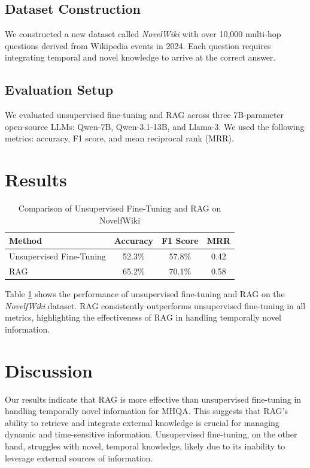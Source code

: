 \documentclass[11pt]{article}
\begin{document}
\subsection{Dataset Construction}
We constructed a new dataset called \textit{NovelWiki} with over 10,000 multi-hop questions derived from Wikipedia events in 2024. Each question requires integrating temporal and novel knowledge to arrive at the correct answer.

\subsection{Evaluation Setup}
We evaluated unsupervised fine-tuning and RAG across three 7B-parameter open-source LLMs: Qwen-7B, Qwen-3.1-13B, and Llama-3. We used the following metrics: accuracy, F1 score, and mean reciprocal rank (MRR).

\section{Results}
\begin{table}[ht]
  \centering
  \caption{Comparison of Unsupervised Fine-Tuning and RAG on NovelfWiki}
  \label{tab:results}
  \begin{tabular}{l|ccc}
    \toprule
    Method & Accuracy & F1 Score & MRR \\
    \midrule
    Unsupervised Fine-Tuning & 52.3\% & 57.8\% & 0.42 \\
    RAG & 65.2\% & 70.1\% & 0.58 \\
    \bottomrule
  \end{tabular}
\end{table}

Table \ref{tab:results} shows the performance of unsupervised fine-tuning and RAG on the \textit{NovelfWiki} dataset. RAG consistently outperforms unsupervised fine-tuning in all metrics, highlighting the effectiveness of RAG in handling temporally novel information.

\section{Discussion}
Our results indicate that RAG is more effective than unsupervised fine-tuning in handling temporally novel information for MHQA. This suggests that RAG's ability to retrieve and integrate external knowledge is crucial for managing dynamic and time-sensitive information. Unsupervised fine-tuning, on the other hand, struggles with novel, temporal knowledge, likely due to its inability to leverage external sources of information.
\end{document}
